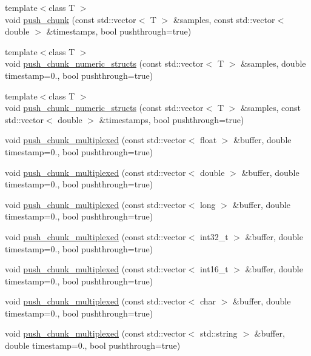 \begin{DoxyCompactItemize}
\item 
{\footnotesize template$<$class T $>$ }\\void \hyperlink{classlsl_1_1stream__outlet_a05ff22ae7b36a9e64dc08f71b45913e6}{push\+\_\+chunk} (const std\+::vector$<$ T $>$ \&samples, const std\+::vector$<$ double $>$ \&timestamps, bool pushthrough=true)
\item 
{\footnotesize template$<$class T $>$ }\\void \hyperlink{classlsl_1_1stream__outlet_ad7e1405b50bc546c4f742f508aa734cc}{push\+\_\+chunk\+\_\+numeric\+\_\+structs} (const std\+::vector$<$ T $>$ \&samples, double timestamp=0., bool pushthrough=true)
\item 
{\footnotesize template$<$class T $>$ }\\void \hyperlink{classlsl_1_1stream__outlet_a226b11eae43287c7b72e4d0ca1e812e7}{push\+\_\+chunk\+\_\+numeric\+\_\+structs} (const std\+::vector$<$ T $>$ \&samples, const std\+::vector$<$ double $>$ \&timestamps, bool pushthrough=true)
\item 
void \hyperlink{classlsl_1_1stream__outlet_adafb6b76614ea386917f696bdb272209}{push\+\_\+chunk\+\_\+multiplexed} (const std\+::vector$<$ float $>$ \&buffer, double timestamp=0., bool pushthrough=true)
\item 
void \hyperlink{classlsl_1_1stream__outlet_aa42becb37b937c5d6319dac67a0da4a4}{push\+\_\+chunk\+\_\+multiplexed} (const std\+::vector$<$ double $>$ \&buffer, double timestamp=0., bool pushthrough=true)
\item 
void \hyperlink{classlsl_1_1stream__outlet_abe328c3200c383d160ca0e00029b8124}{push\+\_\+chunk\+\_\+multiplexed} (const std\+::vector$<$ long $>$ \&buffer, double timestamp=0., bool pushthrough=true)
\item 
void \hyperlink{classlsl_1_1stream__outlet_a341840ed1504e2cfa0cc9c15263e030a}{push\+\_\+chunk\+\_\+multiplexed} (const std\+::vector$<$ int32\+\_\+t $>$ \&buffer, double timestamp=0., bool pushthrough=true)
\item 
void \hyperlink{classlsl_1_1stream__outlet_a874e84f39bf470f755aa46da300244f6}{push\+\_\+chunk\+\_\+multiplexed} (const std\+::vector$<$ int16\+\_\+t $>$ \&buffer, double timestamp=0., bool pushthrough=true)
\item 
void \hyperlink{classlsl_1_1stream__outlet_af1bedf881293459205b9ba5df7b92051}{push\+\_\+chunk\+\_\+multiplexed} (const std\+::vector$<$ char $>$ \&buffer, double timestamp=0., bool pushthrough=true)
\item 
void \hyperlink{classlsl_1_1stream__outlet_a554027868fa9710470f0c3f057904b4b}{push\+\_\+chunk\+\_\+multiplexed} (const std\+::vector$<$ std\+::string $>$ \&buffer, double timestamp=0., bool pushthrough=true)

\end{DoxyCompactItemize}
